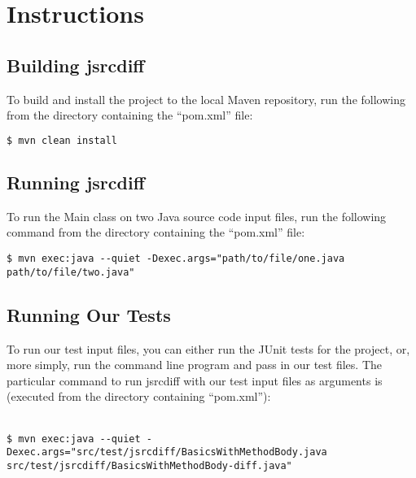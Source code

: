 \chapter{Instructions}

\section{Building jsrcdiff}

To build and install the project to the local Maven repository, run the
following from the directory containing the ``pom.xml'' file:\\

\begin{lstlisting}[language=bash,frame=single,showstringspaces=false]
$ mvn clean install
\end{lstlisting}


\section{Running jsrcdiff}

To run the Main class on two Java source code input files, run the following
command from the directory containing the ``pom.xml'' file:\\

\begin{lstlisting}[frame=single,breaklines=true,showstringspaces=false]
$ mvn exec:java --quiet -Dexec.args="path/to/file/one.java path/to/file/two.java"
\end{lstlisting}

\section{Running Our Tests}

To run our test input files, you can either run the JUnit tests for the project,
or, more simply, run the command line program and pass in our test files.
The particular command to run jsrcdiff with our test input files as
arguments is (executed from the directory containing ``pom.xml''):\\ \\

\begin{lstlisting}[frame=single,breaklines=true,showstringspaces=false]
$ mvn exec:java --quiet -Dexec.args="src/test/jsrcdiff/BasicsWithMethodBody.java src/test/jsrcdiff/BasicsWithMethodBody-diff.java"
\end{lstlisting}
